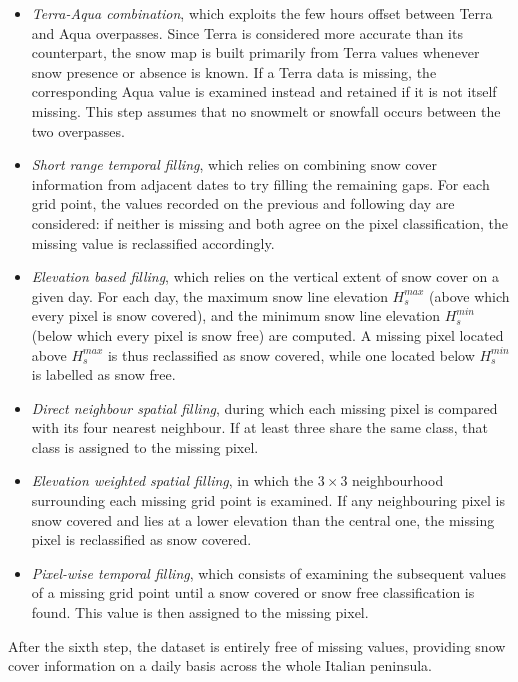 \begin{itemize}[label=$\blacktriangleright$]
    \item \textit{Terra-Aqua combination}, which exploits the few hours offset between Terra and Aqua overpasses. Since Terra is 
    considered more accurate than its counterpart, the snow map is built primarily from Terra values whenever snow presence or 
    absence is known. If a Terra data is missing, the corresponding Aqua value is examined instead and retained if it is not itself 
    missing. This step assumes that no snowmelt or snowfall occurs between the two overpasses.
    \item \textit{Short range temporal filling}, which relies on combining snow cover information from adjacent dates to try filling 
    the remaining gaps. For each grid point, the values recorded on the previous and following day are considered: if neither is 
    missing and both agree on the pixel classification, the missing value is reclassified accordingly.
    \item \textit{Elevation based filling}, which relies on the vertical extent of snow cover on a given day. For each day, the 
    maximum snow line elevation $H_s^{max}$ (above which every pixel is snow covered), and the minimum snow line elevation $H_s^{min}$ 
    (below which every pixel is snow free) are computed. A missing pixel located above $H_s^{max}$ is thus reclassified as snow 
    covered, while one located below $H_s^{min}$ is labelled as snow free.
    \item \textit{Direct neighbour spatial filling}, during which each missing pixel is compared with its four nearest neighbour. If 
    at least three share the same class, that class is assigned to the missing pixel.
    \item \textit{Elevation weighted spatial filling}, in which the $3\times3$ neighbourhood surrounding each missing grid point is 
    examined. If any neighbouring pixel is snow covered and lies at a lower elevation than the central one, the missing pixel is 
    reclassified as snow covered.
    \item \textit{Pixel-wise temporal filling}, which consists of examining the subsequent values of a missing grid point until a 
    snow covered or snow free classification is found. This value is then assigned to the missing pixel.
\end{itemize}

After the sixth step, the dataset is entirely free of missing values, providing snow cover information on a daily basis across the 
whole Italian peninsula.



